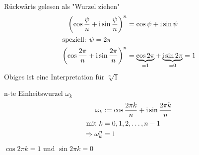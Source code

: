 Rückwärts gelesen als "Wurzel ziehen"
\begin{align*}
	\left(\cos\frac{\psi}{n} + \operatorname{i} \sin\frac{\psi}{n}\right)^n &= \cos \psi + \operatorname{i} \sin \psi \\
	\intertext{speziell: $\psi = 2\pi$}
	\left(\cos\frac{2\pi}{n} + \operatorname{i} \sin\frac{2\pi}{n}\right)^n &= \underbrace{\cos 2\pi}_{=1} + \underbrace{\operatorname{i} \sin 2\pi}_{=0} = 1 \\
\end{align*}
Obiges ist eine Interpretation für $\sqrt[n]{1}$

\begin{definition}
	n-te Einheitswurzel $\omega_k$
	\begin{align*}
		\omega_k &:= \cos\frac{2\pi k}{n} + \operatorname{i} \sin\frac{2\pi k}{n} \\
		\text{mit } k &= 0, 1, 2, \ldots, n - 1 \\
		\Rightarrow \omega_k^n &= 1
	\end{align*}
	\begin{note}
		$\cos 2\pi k = 1 \text{ und } \sin 2\pi k = 0$
	\end{note}
\end{definition}

